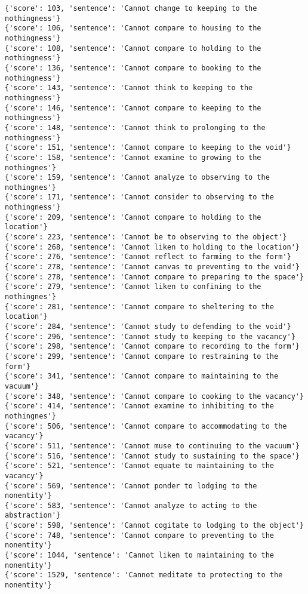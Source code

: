 \documentclass[12pt,a4paper,oneside]{book}
\begin{document}
\begin{verbatim}
{'score': 103, 'sentence': 'Cannot change to keeping to the nothingness'}
{'score': 106, 'sentence': 'Cannot compare to housing to the nothingness'}
{'score': 108, 'sentence': 'Cannot compare to holding to the nothingness'}
{'score': 136, 'sentence': 'Cannot compare to booking to the nothingness'}
{'score': 143, 'sentence': 'Cannot think to keeping to the nothingness'}
{'score': 146, 'sentence': 'Cannot compare to keeping to the nothingness'}
{'score': 148, 'sentence': 'Cannot think to prolonging to the nothingness'}
{'score': 151, 'sentence': 'Cannot compare to keeping to the void'}
{'score': 158, 'sentence': 'Cannot examine to growing to the nothingnes'}
{'score': 159, 'sentence': 'Cannot analyze to observing to the nothingnes'}
{'score': 171, 'sentence': 'Cannot consider to observing to the nothingness'}
{'score': 209, 'sentence': 'Cannot compare to holding to the location'}
{'score': 223, 'sentence': 'Cannot be to observing to the object'}
{'score': 268, 'sentence': 'Cannot liken to holding to the location'}
{'score': 276, 'sentence': 'Cannot reflect to farming to the form'}
{'score': 278, 'sentence': 'Cannot canvas to preventing to the void'}
{'score': 278, 'sentence': 'Cannot compare to preparing to the space'}
{'score': 279, 'sentence': 'Cannot liken to confining to the nothingnes'}
{'score': 281, 'sentence': 'Cannot compare to sheltering to the location'}
{'score': 284, 'sentence': 'Cannot study to defending to the void'}
{'score': 296, 'sentence': 'Cannot study to keeping to the vacancy'}
{'score': 298, 'sentence': 'Cannot compare to recording to the form'}
{'score': 299, 'sentence': 'Cannot compare to restraining to the form'}
{'score': 341, 'sentence': 'Cannot compare to maintaining to the vacuum'}
{'score': 348, 'sentence': 'Cannot compare to cooking to the vacancy'}
{'score': 414, 'sentence': 'Cannot examine to inhibiting to the nothingnes'}
{'score': 506, 'sentence': 'Cannot compare to accommodating to the vacancy'}
{'score': 511, 'sentence': 'Cannot muse to continuing to the vacuum'}
{'score': 516, 'sentence': 'Cannot study to sustaining to the space'}
{'score': 521, 'sentence': 'Cannot equate to maintaining to the vacancy'}
{'score': 569, 'sentence': 'Cannot ponder to lodging to the nonentity'}
{'score': 583, 'sentence': 'Cannot analyze to acting to the abstraction'}
{'score': 598, 'sentence': 'Cannot cogitate to lodging to the object'}
{'score': 748, 'sentence': 'Cannot compare to preventing to the nonentity'}
{'score': 1044, 'sentence': 'Cannot liken to maintaining to the nonentity'}
{'score': 1529, 'sentence': 'Cannot meditate to protecting to the nonentity'}

\end{verbatim}
\end{document}
